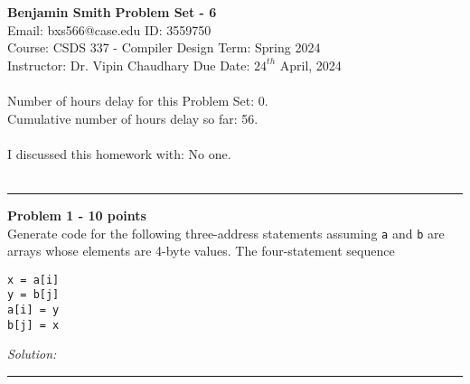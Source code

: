 \documentclass[a4paper, 11pt]{article}
\newenvironment{problem}[2][Problem]
    { \begin{mdframed}[backgroundcolor=gray!20] \textbf{#1 #2} \\}
    {  \end{mdframed}}
\newenvironment{solution}
    {\textit{Solution:}}
    {}
\begin{document}
\noindent
\large\textbf{Benjamin Smith} \hfill \textbf{Problem Set - 6}   \\
Email: bxs566@case.edu \hfill ID: 3559750 \\
\normalsize Course: CSDS 337 - Compiler Design \hfill Term: Spring 2024\\
Instructor: Dr. Vipin Chaudhary \hfill Due Date: $24^{th}$ April, 2024 \\ \\
Number of hours delay for this Problem Set: \hfill 0.\\
Cumulative number of hours delay so far: \hfill 56. \\ \\
I discussed this homework with: \hfill No one. \\ \\

\noindent\rule{7in}{2.8pt}
\begin{problem}{1 - 10 points}
Generate code for the following three-address statements assuming \verb!a! and \verb!b! are arrays whose elements are 4-byte values. The four-statement sequence
\begin{verbatim}
x = a[i]  
y = b[j]  
a[i] = y  
b[j] = x  
\end{verbatim}

\end{problem}
\begin{solution}
\end{solution}

\noindent\rule{7in}{2.8pt}

\end{document}
